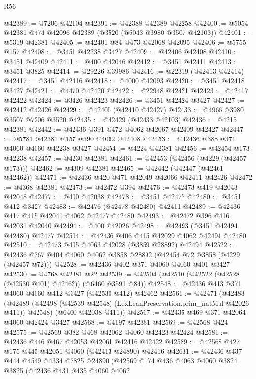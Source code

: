 \begin{lexlean}{R56}
\begin{coremodule}
@42389 := @7206 @42104
@42391 := @42388 @42389 @42258
@42400 := @5054 @42381 @474 @42096 @42389 (@3520 (@5043 @3980 @3507 @42103))
@42401 := @5319 @42381
@42405 := @42401 @84 @473 @42068 @42095
@42406 := @5755 @157
@42408 := @3451 @42238 @3427
@42409 := @42406 @42408
@42410 := @3451 @42409
@42411 := @400 @42046
@42412 := @3451 @42411
@42413 := @3451 @3825
@42414 := @29226 @39986
@42416 := @22319 (@42413 @42414)
@42417 := @3451 @42416
@42418 := @4000 @42093
@42420 := @3451 @42418 @3427
@42421 := @4470 @42420
@42422 := @22948 @42421
@42423 := @42417 @42422
@42424 := @3426 @42423
@42426 := @3451 @42424 @3427
@42427 := @42412 @42426
@42429 := @42405 (@42410 @42427)
@42433 := @4966 @3980 @3507 @7206 @3520
@42435 := @42429 (@42433 @42103)
@42436 := @4215 @42381
@42442 := @42436 @391 @472 @4062 @42067 @42409 @42427
@42447 := @5781 @42381 @157 @390 @4062 @42408
@42453 := @42436 @388 @371 @4060 @4060 @42238 @3427
@42454 := @4224 @42381
@42456 := @42454 @173 @42238
@42457 := @4230 @42381
@42461 := @42453 (@42456 (@4229 (@42457 @173)))
@42462 := @4309 @42381
@42465 := @42442 (@42447 (@42461 @42462))
@42471 := @42436 @420 @471 @42049 @42066 @42411 @42426
@42472 := @4368 @42381
@42473 := @42472 @394
@42476 := @42473 @419 @42043 @42048
@42477 := @400 @42038
@42478 := @3451 @42477
@42480 := @3451 @412 @3427
@42483 := @42476 (@42478 @42480) @42411
@42489 := @42436 @417 @415 @42041 @4062 @42477 @42480
@42493 := @42472 @396 @416 @42031 @42040
@42494 := @400 @42026
@42498 := @42493 (@3451 @42494 @42480) @42477
@42504 := @42436 @406 @415 @42029 @4062 @42494 @42480
@42510 := @42473 @405 @4063 @42028 (@3859 @28892) @42494
@42522 := @42436 @367 @404 @4060 @4062 @3858 @28892 (@42454 @72 @3858 (@4229 (@42457 @72)))
@42528 := @42436 @402 @371 @4060 @4060 @401 @3427
@42530 := @4768 @42381 @22
@42539 := @42504 (@42510 (@42522 (@42528 (@42530 @401) @42462)) (@6460 @3591 @84))
@42548 := @42436 @413 @371 @4060 @4060 @412 @3427 (@42530 @412) @42462
@42561 := @42471
    (@42483
      (@42489 (@42498 (@42539 @42548) (LexLeanPreservation.prim_natMul @42026 @411)) @42548)
      (@6460 @42038 @411))
@42567 := @42436 @469 @371 @42064 @4060 @42424 @3427
@42568 := @4197 @42381
@42569 := @42568 @424
@42575 := @42569 @382 @468 @42062 @4060 @42423 @42424
@42581 := @42436 @446 @467 @42053 @42061 @42416 @42422
@42589 := @42568 @427 @175 @445 @42051 @4060 (@42413 @24890) @42416
@42631 := @42436
    @437
    @444
    @4549
    @4334
    @3825
    @24890
    (@42569
      @174
      @436
      @4063
      @4060
      @3824
      @3825
      (@42436
        @431
        @435
        @4060
        @4062

\end{coremodule}
\end{lexlean}
